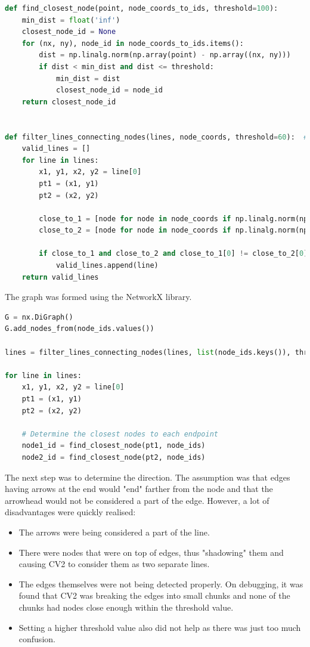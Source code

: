 \documentclass{article}
\begin{document}
\begin{lstlisting}[language=Python, caption=Functions to filter proper edges]
def find_closest_node(point, node_coords_to_ids, threshold=100):
    min_dist = float('inf')
    closest_node_id = None
    for (nx, ny), node_id in node_coords_to_ids.items():
        dist = np.linalg.norm(np.array(point) - np.array((nx, ny)))
        if dist < min_dist and dist <= threshold:
            min_dist = dist
            closest_node_id = node_id
    return closest_node_id


def filter_lines_connecting_nodes(lines, node_coords, threshold=60):  # ← relaxed
    valid_lines = []
    for line in lines:
        x1, y1, x2, y2 = line[0]
        pt1 = (x1, y1)
        pt2 = (x2, y2)

        close_to_1 = [node for node in node_coords if np.linalg.norm(np.array(pt1) - np.array(node)) < threshold]
        close_to_2 = [node for node in node_coords if np.linalg.norm(np.array(pt2) - np.array(node)) < threshold]

        if close_to_1 and close_to_2 and close_to_1[0] != close_to_2[0]:
            valid_lines.append(line)
    return valid_lines
\end{lstlisting}

The graph was formed using the NetworkX library.

\begin{lstlisting}[language=Python, caption=Extra steps added in preprocessing]
G = nx.DiGraph()
G.add_nodes_from(node_ids.values())

lines = filter_lines_connecting_nodes(lines, list(node_ids.keys()), threshold=80)

for line in lines:
    x1, y1, x2, y2 = line[0]
    pt1 = (x1, y1)
    pt2 = (x2, y2)

    # Determine the closest nodes to each endpoint
    node1_id = find_closest_node(pt1, node_ids)
    node2_id = find_closest_node(pt2, node_ids)
\end{lstlisting}

The next step was to determine the direction. The assumption was that edges having arrows at the end would "end" farther from the node and that the arrowhead would not be considered a part of the edge. However, a lot of disadvantages were quickly realised:

\begin{itemize}
    \item The arrows were being considered a part of the line.
    \item There were nodes that were on top of edges, thus "shadowing" them and causing CV2 to consider them as two separate lines.
    \item The edges themselves were not being detected properly. On debugging, it was found that CV2 was breaking the edges into small chunks and none of the chunks had nodes close enough within the threshold value.
    \item Setting a higher threshold value also did not help as there was just too much confusion.
\end{itemize}
\end{document}
